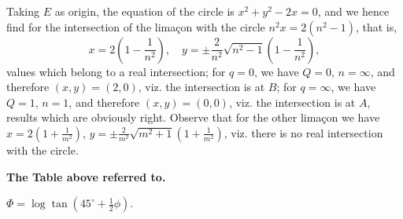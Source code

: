 \documentclass[11pt,a4paper]{article}
\theoremstyle{definition}
\begin{document}
Taking $E$ as origin, the equation of the circle is $x^2 + y^2 - 2x = 0$, and we hence find for the intersection of the lima\c{c}on with the circle $n^2x = 2(n^2 - 1)$, that is,
\[
x = 2\left(1 - \frac{1}{n^2}\right), \quad y = \pm\frac{2}{n^2}\sqrt{n^2 - 1}\left(1 - \frac{1}{n^2}\right),
\]
values which belong to a real intersection; for $q = 0$, we have $Q = 0$, $n = \infty$, and therefore $(x,y) = (2,0)$, viz. the intersection is at $B$; for $q = \infty$, we have $Q = 1$, $n = 1$, and therefore $(x,y) = (0,0)$, viz. the intersection is at $A$, results which are obviously right. Observe that for the other lima\c{c}on we have $x = 2(1 + \frac{1}{m^2})$, $y = \pm\frac{2}{m^2}\sqrt{m^2 + 1}(1 + \frac{1}{m^2})$, viz. there is no real intersection with the circle.

\bigskip

\begin{center}
\textbf{The Table above referred to.}

\smallskip
$\Phi = \log \tan(45^\circ + \frac{1}{2}\phi)$.
\end{center}

\medskip
\end{document}
